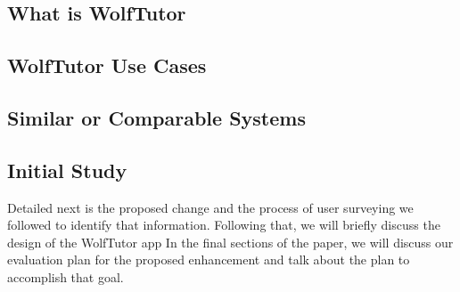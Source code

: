 \subsection{What is WolfTutor}
\label{sec:what-wolftutor}


\subsection{WolfTutor Use Cases}
\label{sec:wolftutor-use-cases}


\subsection{Similar or Comparable Systems}
\label{sec:pain-points-with}


\subsection{Initial Study}
\label{sec:initial-study}

Detailed next is the proposed change and the process of user surveying
we followed to identify that information.  Following that, we will
briefly discuss the design of the WolfTutor app In the final sections
of the paper, we will discuss our evaluation plan for the proposed
enhancement and talk about the plan to accomplish that goal.

